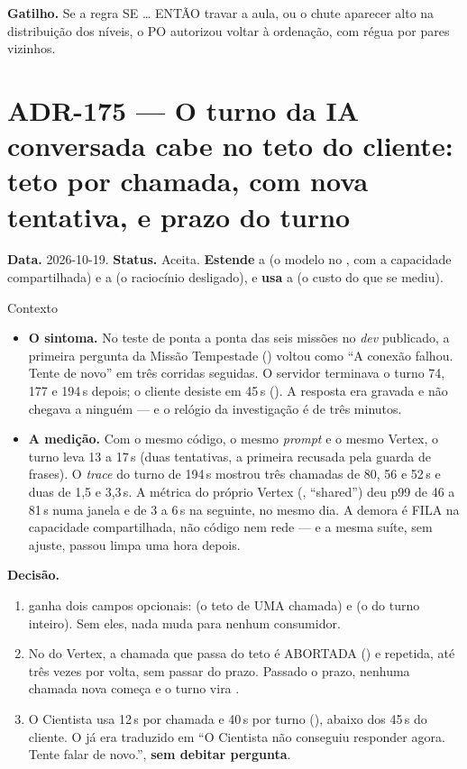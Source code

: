 \textbf{Gatilho.} Se a regra SE \ldots{} ENTÃO travar a aula, ou o chute
aparecer alto na distribuição dos níveis, o PO autorizou voltar à ordenação,
com régua por pares vizinhos.

\section{ADR-175 --- O turno da IA conversada cabe no teto do cliente: teto por chamada, com nova tentativa, e prazo do turno}
\label{adr:teto-por-chamada}

\textbf{Data.} 2026-10-19. \textbf{Status.} Aceita. \textbf{Estende} a
 (o modelo no , com a capacidade compartilhada) e a
 (o raciocínio desligado), e \textbf{usa} a  (o
custo do que se mediu).

\begin{especificacao}{Contexto}
\begin{itemize}
  \item \textbf{O sintoma.} No teste de ponta a ponta das seis missões no
    \emph{dev} publicado, a primeira pergunta da Missão Tempestade
    () voltou como \enquote{A conexão falhou. Tente de novo} em
    três corridas seguidas. O servidor terminava o turno 74, 177 e 194\,s
    depois; o cliente desiste em 45\,s (). A
    resposta era gravada e não chegava a ninguém --- e o relógio da
    investigação é de três minutos.
  \item \textbf{A medição.} Com o mesmo código, o mesmo \emph{prompt} e o
    mesmo Vertex, o turno leva 13 a 17\,s (duas tentativas, a primeira
    recusada pela guarda de frases). O \emph{trace} do turno de 194\,s mostrou
    três chamadas de 80, 56 e 52\,s e duas de 1,5 e 3,3\,s. A métrica do
    próprio Vertex (, 
    \enquote{shared}) deu p99 de 46 a 81\,s numa janela e de 3 a 6\,s na
    seguinte, no mesmo dia. A demora é FILA na capacidade compartilhada, não
    código nem rede --- e a mesma suíte, sem ajuste, passou limpa uma hora
    depois.
\end{itemize}
\end{especificacao}

\textbf{Decisão.}

\begin{enumerate}
  \item {} ganha dois campos opcionais:
     (o teto de UMA chamada) e  (o do turno
    inteiro). Sem eles, nada muda para nenhum consumidor.
  \item No  do Vertex, a chamada que passa do teto é ABORTADA
    () e repetida, até três vezes por volta, sem
    passar do prazo. Passado o prazo, nenhuma chamada nova começa e o turno
    vira .
  \item O Cientista usa 12\,s por chamada e 40\,s por turno
    (), abaixo dos 45\,s do cliente. O
     já era traduzido em \enquote{O Cientista não conseguiu
    responder agora. Tente falar de novo.}, \textbf{sem debitar pergunta}.
\end{enumerate}

